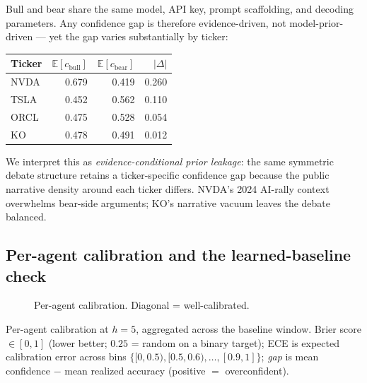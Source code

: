 \documentclass[11pt,a4paper]{article}
\begin{document}
Bull and bear share the same model, API key, prompt scaffolding, and
decoding parameters. Any confidence gap is therefore evidence-driven,
not model-prior-driven --- yet the gap varies substantially by ticker:

\begin{center}
\begin{tabular}{lrrr}
\toprule
Ticker & $\mathbb{E}[c_{\text{bull}}]$ & $\mathbb{E}[c_{\text{bear}}]$ & $|\Delta|$ \\
\midrule
NVDA & 0.679 & 0.419 & 0.260 \\
TSLA & 0.452 & 0.562 & 0.110 \\
ORCL & 0.475 & 0.528 & 0.054 \\
KO   & 0.478 & 0.491 & 0.012 \\
\bottomrule
\end{tabular}
\end{center}

We interpret this as \emph{evidence-conditional prior leakage}: the
same symmetric debate structure retains a ticker-specific
confidence gap because the public narrative density around each
ticker differs. NVDA's 2024 AI-rally context overwhelms bear-side
arguments; KO's narrative vacuum leaves the debate balanced.

\subsection{Per-agent calibration and the learned-baseline check}
\label{sec:results-calibration}

\begin{figure}[h]
  \centering
  \caption{Per-agent calibration. Diagonal = well-calibrated.}
  \label{fig:calibration}
\end{figure}

Per-agent calibration at $h{=}5$, aggregated across the baseline
window. Brier score $\in[0,1]$ (lower better; $0.25$ = random on a
binary target); ECE is expected calibration error across bins
$\{[0,0.5), [0.5,0.6), \ldots, [0.9,1]\}$; \emph{gap} is mean
confidence $-$ mean realized accuracy (positive $=$ overconfident).
\end{document}

